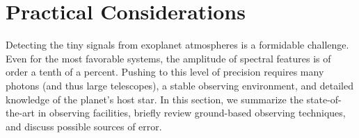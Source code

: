 \documentclass[graybox,natbib,nosecnum]{svmult}
\begin{document}



\section{Practical Considerations}
Detecting the tiny signals from exoplanet atmospheres is a formidable challenge. Even for the most favorable systems, the amplitude of spectral features is of order a tenth of a percent. Pushing to this level of precision requires many photons (and thus large telescopes), a stable observing environment, and detailed knowledge of the planet's host star.  In this section, we summarize the state-of-the-art in observing facilities, briefly review ground-based observing techniques, and discuss possible sources of error.
\end{document}
